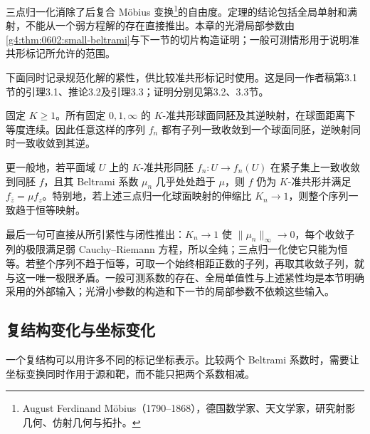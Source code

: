 三点归一化消除了后复合 Möbius 变换\footnote{August Ferdinand Möbius（1790--1868），德国数学家、天文学家，研究射影几何、仿射几何与拓扑。}的自由度。定理的结论包括全局单射和满射，不能从一个弱方程解的存在直接推出。本章的光滑局部参数由\cref{g4:thm:0602:small-beltrami}与下一节的切片构造证明；一般可测情形用于说明准共形标记所允许的范围。

下面同时记录规范化解的紧性，供比较准共形标记时使用。这是同一作者稿第3.1节的引理3.1、推论3.2及引理3.3；证明分别见第3.2、3.3节。\cite[作者稿第11--15页]{Glutsyuk2008Uniformization}

\begin{theorem}\label{g4:thm:0602:qc-compactness}
	固定 \(K\ge1\)。所有固定 \(0,1,\infty\) 的 \(K\)-准共形球面同胚及其逆映射，在球面距离下等度连续。因此任意这样的序列 \(f_n\) 都有子列一致收敛到一个球面同胚，逆映射同时一致收敛到其逆。

	更一般地，若平面域 \(U\) 上的 \(K\)-准共形同胚 \(f_n:U\to f_n(U)\) 在紧子集上一致收敛到同胚 \(f\)，且其 Beltrami 系数 \(\mu_n\) 几乎处处趋于 \(\mu\)，则 \(f\) 仍为 \(K\)-准共形并满足 \(f_{\overline z}=\mu f_z\)。特别地，若上述三点归一化球面映射的伸缩比 \(K_n\to1\)，则整个序列一致趋于恒等映射。
\end{theorem}

最后一句可直接从所引紧性与闭性推出：\(K_n\to1\) 使 \(\|\mu_n\|_\infty\to0\)，每个收敛子列的极限满足弱 Cauchy--Riemann 方程，所以全纯；三点归一化使它只能为恒等。若整个序列不趋于恒等，可取一个始终相距正数的子列，再取其收敛子列，就与这一唯一极限矛盾。一般可测系数的存在、全局单值性与上述紧性均是本节明确采用的外部输入；光滑小参数的构造和下一节的局部参数不依赖这些输入。

\subsection{复结构变化与坐标变化}
\label{g4:subsec:0602:04}

一个复结构可以用许多不同的标记坐标表示。比较两个 Beltrami 系数时，需要让坐标变换同时作用于源和靶，而不能只把两个系数相减。

